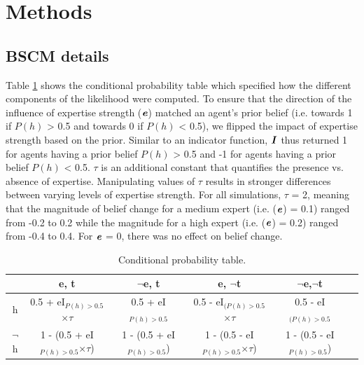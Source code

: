 \documentclass[fleqn,10pt]{wlscirep}
\begin{document}


\section*{Methods}

\subsection*{BSCM details}

Table \ref{tab:t2} shows the conditional probability table which specified how the different components of the likelihood were computed. To ensure that the direction of the influence of expertise strength (\(\textbf{\textit{e}}\)) matched an agent's prior belief (i.e. towards 1 if \(P(h)\) > 0.5 and towards 0 if  \(P(h)\) < 0.5), we flipped the impact of expertise strength based on the prior. Similar to an indicator function, \(\textbf{\emph{I}}\) thus returned 1 for agents having a prior belief \(P(h)\) > 0.5 and -1 for agents having a prior belief \(P(h)\) < 0.5. \(\tau\) is an additional constant that quantifies the presence vs. absence of expertise. Manipulating values of \(\tau\) results in stronger differences between varying levels of expertise strength. For all simulations, \(\tau\) = 2, meaning that the magnitude of belief change for a medium expert (i.e.  (\(\textbf{\textit{e}}\)) = 0.1) ranged from -0.2 to 0.2 while the magnitude for a high expert (i.e.  (\(\textbf{\textit{e}}\)) = 0.2) ranged from -0.4 to 0.4. For  \(\textbf{\textit{e}}\) = 0, there was no effect on belief change. 

\begin{table}[ht]
\label{tab:bscm_details}
\centering
\begin{tabular}{|c|c|c|c|c|c}

\hline
& e, t & \(\neg\)e, t & e, \(\neg\)t & \(\neg\)e,\(\neg\)t\\
\hline
h & 0.5 + eI\(_{P(h)>0.5}\)\(\times\)\(\tau\) & 0.5 + eI\(_{P(h)>0.5}\) & 0.5 - eI\(_{(P(h)>0.5}\)\(\times\)\(\tau\) &  0.5 - eI\(_{(P(h)>0.5}\)\\

\hline
\(\neg\)h & 1 - (0.5 + eI\(_{P(h)>0.5}\)\(\times\)\(\tau\)) & 1 - (0.5 + eI\(_{P(h)>0.5}\)) & 1 - (0.5 - eI\(_{P(h)>0.5}\)\(\times\)\(\tau\)) & 1 - (0.5 - eI\(_{P(h)>0.5}\))\\

\hline
\end{tabular}
\caption{\label{tab:t2}Conditional probability table.}
\end{table}
\end{document}
